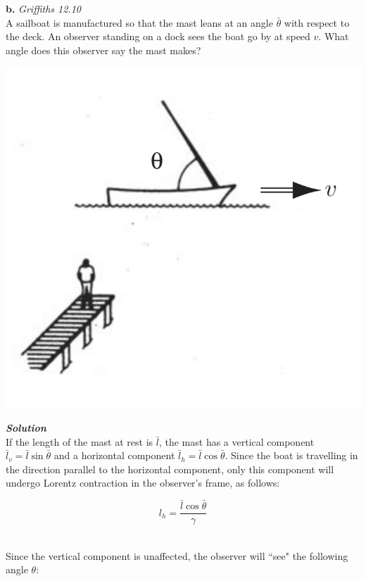 \documentclass[9pt]{extarticle}
\newcommand{\bfit}[1]{\textbf{\textit{#1}}}
\begin{document}
\begin{multicols*}{2}
 


\dotfill 

\hfill 

{\Large \bf b.} {\it Griffiths 12.10} \\ 

A sailboat is manufactured so that the mast leans at an angle $\bar\theta$ with respect to the deck. An observer standing on a dock sees the boat go by at speed $v$. What angle does this observer say the mast makes? \\ 

\begin{center}
	\includegraphics[scale=0.4]{ps11-pic1.png}
\end{center}

{\bfit{Solution}} \\ 

If the length of the mast at rest is $\bar l$, the mast has a vertical component $\bar l_v = \bar l \sin\bar\theta$ and a horizontal component $\bar l_h = \bar l \cos\bar\theta$. Since the boat is travelling in the direction parallel to the horizontal component, only this component will undergo Lorentz contraction in the observer's frame, as follows:

$$l_h = \frac{\bar l\cos\bar\theta}{\gamma}$$ \ 

Since the vertical component is unaffected, the observer will ``see" the following angle $\theta$:


\end{multicols*}
\end{document}
